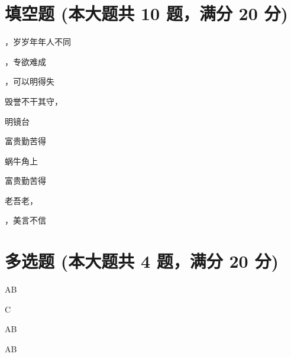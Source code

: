\documentclass[12pt, a4paper, addpoints, answers]{exam}
\begin{document}
\hspace{5cm}

\section{\normalsize{填空题 (本大题共 10 题，满分 20 分)}}
\hspace{1.5cm}
\begin{multicols}{2}
\begin{questions}
\question[2] \fillin ，岁岁年年人不同

\question[2] \fillin ，专欲难成

\question[2] \fillin ，可以明得失

\question[2] 毁誉不干其守，\fillin 

\question[2] \fillin 明镜台

\question[2] 富贵\fillin 勤苦得

\question[2] 蜗牛角上\fillin 

\question[2] 富贵\fillin 勤苦得

\question[2] 老吾老，\fillin 

\question[2] \fillin ，美言不信

\end{questions}
\end{multicols}

\hspace{5cm}

\section{\normalsize{多选题 (本大题共 4 题，满分 20 分)}}
\hspace{1.5cm}

\begin{questions}
\question[5] AB

\begin{oneparcheckboxes}
\end{oneparcheckboxes}

\question[5] C

\begin{oneparcheckboxes}
\end{oneparcheckboxes}

\question[5] AB

\begin{oneparcheckboxes}
\end{oneparcheckboxes}

\question[5] AB

\begin{oneparcheckboxes}
\end{oneparcheckboxes}

\end{questions}
\end{document}
